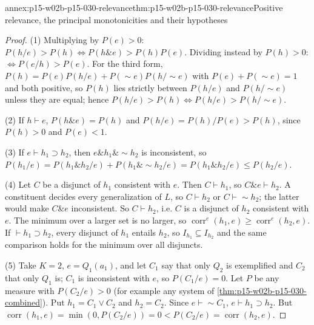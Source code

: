 \begin{annexitem}{annex:p15-w02b-p15-030-relevance}{thm:p15-w02b-p15-030-relevance}{Positive relevance, the principal monotonicities and their hypotheses}
\begin{proof}
(1) Multiplying by \(P(e)>0\): \(P(h/e)>P(h)\iff P(h\&e)>P(h)P(e)\).
Dividing instead by \(P(h)>0\): \(\iff P(e/h)>P(e)\). For the third form,
\(P(h)=P(e)P(h/e)+P(\sim e)P(h/\sim e)\) with \(P(e)+P(\sim e)=1\) and both
positive, so \(P(h)\) lies strictly between \(P(h/e)\) and \(P(h/\sim e)\)
unless they are equal; hence \(P(h/e)>P(h)\iff P(h/e)>P(h/\sim e)\).

(2) If \(h\vdash e\), \(P(h\&e)=P(h)\) and \(P(h/e)=P(h)/P(e)>P(h)\), since
\(P(h)>0\) and \(P(e)<1\).

(3) If \(e\vdash h_1\supset h_2\), then \(e\&h_1\&\sim h_2\) is inconsistent, so
\(P(h_1/e)=P(h_1\&h_2/e)+P(h_1\&\sim h_2/e)=P(h_1\&h_2/e)\leq P(h_2/e)\).

(4) Let \(C\) be a disjunct of \(h_1\) consistent with \(e\). Then
\(C\vdash h_1\), so \(C\&e\vdash h_2\). A constituent decides every
generalization of \(L\), so \(C\vdash h_2\) or \(C\vdash\sim h_2\); the latter
would make \(C\&e\) inconsistent. So \(C\vdash h_2\), i.e. \(C\) is a disjunct
of \(h_2\) consistent with \(e\). The minimum over a larger set is no larger,
so \(\operatorname{corr}^e(h_1,e)\geq\operatorname{corr}^e(h_2,e)\). If
\(\vdash h_1\supset h_2\), every disjunct of \(h_1\) entails \(h_2\), so
\(I_{h_1}\subseteq I_{h_2}\) and the same comparison holds for the minimum over
all disjuncts.

(5) Take \(K=2\), \(e=Q_1(a_1)\), and let \(C_1\) say that only \(Q_2\) is
exemplified and \(C_2\) that only \(Q_1\) is; \(C_1\) is inconsistent with
\(e\), so \(P(C_1/e)=0\). Let \(P\) be any measure with \(P(C_2/e)>0\) (for
example any system of \cref{thm:p15-w02b-p15-030-combined}). Put
\(h_1=C_1\lor C_2\) and \(h_2=C_2\). Since \(e\vdash\sim C_1\), \(e\vdash
h_1\supset h_2\). But \(\operatorname{corr}(h_1,e)=\min(0,P(C_2/e))=0<
P(C_2/e)=\operatorname{corr}(h_2,e)\).
\end{proof}
\end{annexitem}


